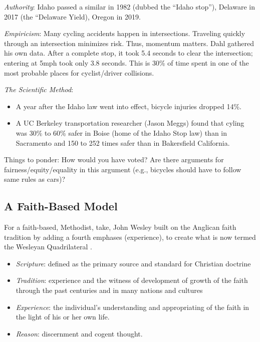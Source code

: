 \documentclass[
  english,
]{book}
\providecommand{\tightlist}{%
  \setlength{\itemsep}{0pt}\setlength{\parskip}{0pt}}
\begin{document}
\emph{Authority}: Idaho passed a similar in 1982 (dubbed the ``Idaho stop''), Delaware in 2017 (the ``Delaware Yield), Oregon in 2019.

\emph{Empiricism}: Many cycling accidents happen in intersections. Traveling quickly through an intersection minimizes risk. Thus, momentum matters. Dahl \citeyearpar{dahl_heres_2020}gathered his own data. After a complete stop, it took 5.4 seconds to clear the intersection; entering at 5mph took only 3.8 seconds. This is 30\% of time spent in one of the most probable places for cyclist/driver collisions.

\emph{The Scientific Method}:

\begin{itemize}
\tightlist
\item
  A year after the Idaho law went into effect, bicycle injuries dropped 14\%.
\item
  A UC Berkeley transportation researcher (Jason Meggs) found that cyling was 30\% to 60\% safer in Boise (home of the Idaho Stop law) than in Sacramento and 150 to 252 times safer than in Bakersfield California.
\end{itemize}

Things to ponder: How would you have voted? Are there arguments for fairness/equity/equality in this argument (e.g., bicycles should have to follow same rules as cars)?

\hypertarget{a-faith-based-model}{%
\subsection{A Faith-Based Model}\label{a-faith-based-model}}

For a faith-based, Methodist, take, John Wesley built on the Anglican faith tradition by adding a fourth emphases (experience), to create what is now termed the Wesleyan Quadrilateral \citep{noauthor_glossary_nodate}.

\begin{itemize}
\tightlist
\item
  \emph{Scripture}: defined as the primary source and standard for Christian doctrine
\item
  \emph{Tradition}: experience and the witness of development of growth of the faith through the past centuries and in many nations and cultures
\item
  \emph{Experience}: the individual's understanding and appropriating of the faith in the light of his or her own life.
\item
  \emph{Reason}: discernment and cogent thought.
\end{itemize}
\end{document}
